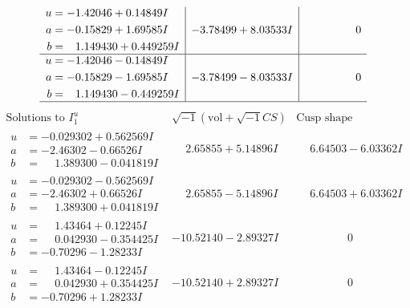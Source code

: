 \documentclass[1p]{elsarticle_modified}
\theoremstyle{definition}
\newcommand{\I}{\sqrt{-1}}
\begin{document}
$$\begin{array}{c|c|c}
\begin{aligned}
u &= -1.42046 + 0.14849 I \\
a &= -0.15829 + 1.69585 I \\
b &= \phantom{-}1.149430 + 0.449259 I\end{aligned}
 & -3.78499 + 8.03533 I & \phantom{-0.000000 } 0 \\ \hline\begin{aligned}
u &= -1.42046 - 0.14849 I \\
a &= -0.15829 - 1.69585 I \\
b &= \phantom{-}1.149430 - 0.449259 I\end{aligned}
 & -3.78499 - 8.03533 I & \phantom{-0.000000 } 0\\
 \hline 
 \end{array}$$\newpage$$\begin{array}{c|c|c}  
\text{Solutions to }I^u_{1}& \I (\text{vol} + \sqrt{-1}CS) & \text{Cusp shape}\\
 \hline 
\begin{aligned}
u &= -0.029302 + 0.562569 I \\
a &= -2.46302 - 0.66526 I \\
b &= \phantom{-}1.389300 - 0.041819 I\end{aligned}
 & \phantom{-}2.65855 + 5.14896 I & \phantom{-}6.64503 - 6.03362 I \\ \hline\begin{aligned}
u &= -0.029302 - 0.562569 I \\
a &= -2.46302 + 0.66526 I \\
b &= \phantom{-}1.389300 + 0.041819 I\end{aligned}
 & \phantom{-}2.65855 - 5.14896 I & \phantom{-}6.64503 + 6.03362 I \\ \hline\begin{aligned}
u &= \phantom{-}1.43464 + 0.12245 I \\
a &= \phantom{-}0.042930 - 0.354425 I \\
b &= -0.70296 - 1.28233 I\end{aligned}
 & -10.52140 - 2.89327 I & \phantom{-0.000000 } 0 \\ \hline\begin{aligned}
u &= \phantom{-}1.43464 - 0.12245 I \\
a &= \phantom{-}0.042930 + 0.354425 I \\
b &= -0.70296 + 1.28233 I\end{aligned}
 & -10.52140 + 2.89327 I & \phantom{-0.000000 } 0 \\ \hline\begin{aligned}

\end{aligned}
\end{array}$$
\end{document}
